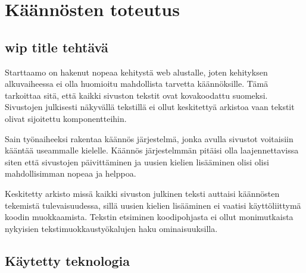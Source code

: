\documentclass[11pt,a4paper,titlepage,oneside]{article}
\begin{document}
\newpage






\section{Käännösten toteutus}




\subsection{wip title tehtävä}


Starttaamo on hakenut nopeaa kehitystä web alustalle, joten kehityksen alkuvaiheessa 
ei olla huomioitu mahdollista tarvetta käännöksille. 
Tämä tarkoittaa sitä, että kaikki sivuston tekstit ovat kovakoodattu suomeksi.
Sivustojen julkisesti näkyvällä tekstillä ei ollut keskitettyä arkistoa vaan tekstit olivat sijoitettu komponentteihin.
\medskip

Sain työnaiheeksi rakentaa käännös järjestelmä, jonka avulla sivustot voitaisiin kääntää useammalle kielelle.
Käännös järjestelmmän pitäisi olla laajennettavissa siten että sivustojen päivittäminen ja uusien kielien lisääminen olisi 
olisi mahdollisimman nopeaa ja helppoa.\\
\medskip

Keskitetty arkisto missä kaikki sivuston julkinen teksti auttaisi käännösten tekemistä tulevaisuudessa,
sillä uusien kielien lisääminen ei vaatisi käyttöliittymä koodin muokkaamista.
Tekstin etsiminen koodipohjasta ei ollut monimutkaista nykyisien tekstimuokkaustyökalujen haku ominaisuuksilla.







\subsection{Käytetty teknologia}


\end{document}

